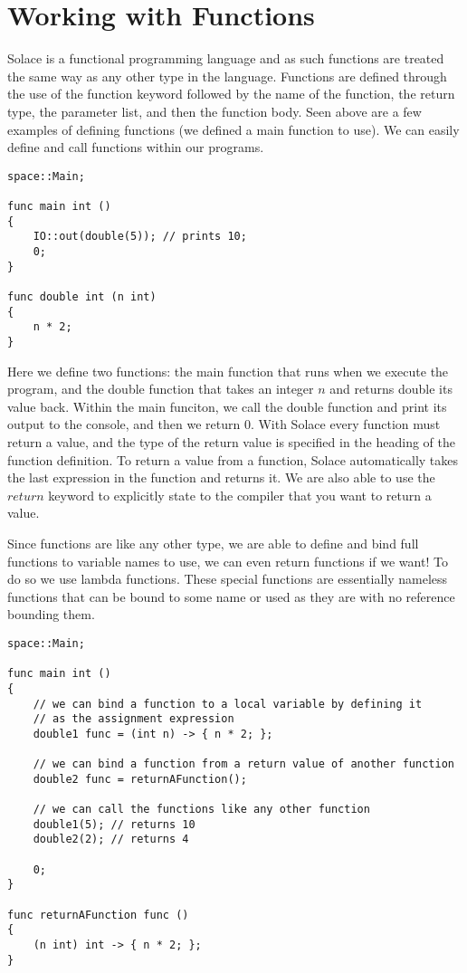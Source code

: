\documentclass{article}
\begin{document}
\section{Working with Functions}

Solace is a functional programming language and as such functions are treated the same way as any other type in the language. Functions are defined through
the use of the function keyword followed by the name of the function, the return type, the parameter list, and then the function body. Seen above are a few
examples of defining functions (we defined a main function to use). We can easily define and call functions within our programs.

\begin{lstlisting}
space::Main;

func main int ()
{
	IO::out(double(5)); // prints 10;
	0;
}

func double int (n int)
{
	n * 2;
}
\end{lstlisting}

Here we define two functions: the main function that runs when we execute the program, and the double function that takes an integer $n$ and returns
double its value back. Within the main funciton, we call the double function and print its output to the console, and then we return $0$. With Solace
every function must return a value, and the type of the return value is specified in the heading of the function definition. To return a value from
a function, Solace automatically takes the last expression in the function and returns it. We are also able to use the $return$ keyword to explicitly
state to the compiler that you want to return a value.

Since functions are like any other type, we are able to define and bind full functions to variable names to use, we can even return functions if we want!
To do so we use lambda functions. These special functions are essentially nameless functions that can be bound to some name or used as they are
with no reference bounding them.

\begin{lstlisting}
space::Main;

func main int ()
{
	// we can bind a function to a local variable by defining it 
	// as the assignment expression
	double1 func = (int n) -> { n * 2; };

	// we can bind a function from a return value of another function
	double2 func = returnAFunction();

	// we can call the functions like any other function
	double1(5); // returns 10
	double2(2); // returns 4

	0;
}

func returnAFunction func ()
{
	(n int) int -> { n * 2; };
}
\end{lstlisting}
\end{document}
